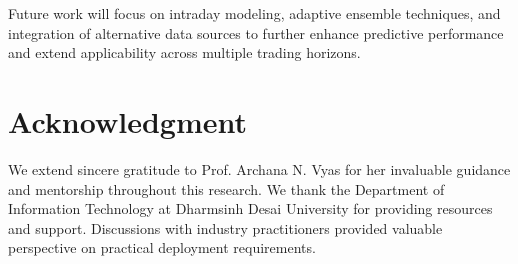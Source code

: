 \documentclass[conference]{IEEEtran}
\begin{document}
Future work will focus on intraday modeling, adaptive ensemble techniques, and integration of alternative data sources to further enhance predictive performance and extend applicability across multiple trading horizons.

\section*{Acknowledgment}

We extend sincere gratitude to Prof. Archana N. Vyas for her invaluable guidance and mentorship throughout this research. We thank the Department of Information Technology at Dharmsinh Desai University for providing resources and support. Discussions with industry practitioners provided valuable perspective on practical deployment requirements.
\end{document}
